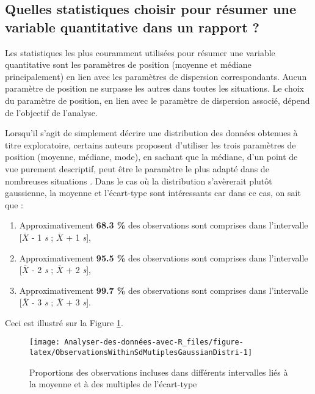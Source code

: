 \documentclass[
  french,
]{book}
\providecommand{\tightlist}{%
  \setlength{\itemsep}{0pt}\setlength{\parskip}{0pt}}
\begin{document}
\hypertarget{quelles-statistiques-choisir-pour-ruxe9sumer-une-variable-quantitative-dans-un-rapport}{%
\subsection{Quelles statistiques choisir pour résumer une variable quantitative dans un rapport ?}\label{quelles-statistiques-choisir-pour-ruxe9sumer-une-variable-quantitative-dans-un-rapport}}

Les statistiques les plus couramment utilisées pour résumer une variable quantitative sont les paramètres de position (moyenne et médiane principalement) en lien avec les paramètres de dispersion correspondants. Aucun paramètre de position ne surpasse les autres dans toutes les situations. Le choix du paramètre de position, en lien avec le paramètre de dispersion associé, dépend de l'objectif de l'analyse.

Lorsqu'il s'agit de simplement décrire une distribution des données obtenues à titre exploratoire, certains auteurs proposent d'utiliser les trois paramètres de position (moyenne, médiane, mode), en sachant que la médiane, d'un point de vue purement descriptif, peut être le paramètre le plus adapté dans de nombreuses situations \autocite{gonzalesMeasuresCentralTendency2001}. Dans le cas où la distribution s'avèrerait plutôt gaussienne, la moyenne et l'écart-type sont intéressants car dans ce cas, on sait que :

\begin{enumerate}
\def\labelenumi{\arabic{enumi}.}
\tightlist
\item
  Approximativement \textbf{68.3 \%} des observations sont comprises dans l'intervalle {[}\(\overline{X}\) - 1 \emph{s} ; \(\overline{X}\) + 1 \emph{s}{]},
\item
  Approximativement \textbf{95.5 \%} des observations sont comprises dans l'intervalle {[}\(\overline{X}\) - 2 \emph{s} ; \(\overline{X}\) + 2 \emph{s}{]},
\item
  Approximativement \textbf{99.7 \%} des observations sont comprises dans l'intervalle {[}\(\overline{X}\) - 3 \emph{s} ; \(\overline{X}\) + 3 \emph{s}{]}.
\end{enumerate}

Ceci est illustré sur la Figure \ref{fig:ObservationsWithinSdMutiplesGaussianDistri}.

\begin{figure}

{\centering \texttt{[image: Analyser-des-données-avec-R\_files/figure-latex/ObservationsWithinSdMutiplesGaussianDistri-1]} 

}

\caption{Proportions des observations incluses dans différents intervalles liés à la moyenne et à des multiples de l'écart-type}\label{fig:ObservationsWithinSdMutiplesGaussianDistri}
\end{figure}
\end{document}
